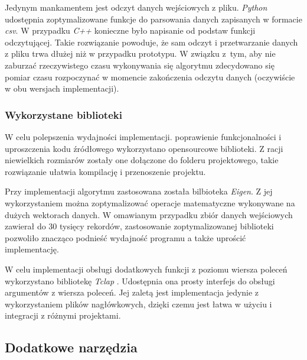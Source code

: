 Jedynym mankamentem jest odczyt danych wejściowych z pliku. \textit{Python} udostępnia zoptymalizowane funkcje do parsowania danych zapisanych w formacie \textit{csv}. W przypadku \textit{C++} konieczne było napisanie od podstaw funkcji odczytującej. Takie rozwiązanie powoduje, że sam odczyt i przetwarzanie danych z pliku trwa dłużej niż w przypadku prototypu. W związku z~tym, aby nie zaburzać rzeczywistego czasu wykonywania się algorytmu zdecydowano się pomiar czasu rozpoczynać w momencie zakończenia odczytu danych (oczywiście w obu wersjach implementacji).

\subsubsection{Wykorzystane biblioteki}
W celu polepszenia wydajności implementacji. poprawienie funkcjonalności i uproszczenia kodu źródłowego wykorzystano opensourcowe biblioteki. Z racji niewielkich rozmiarów zostały one dołączone do folderu projektowego, takie rozwiązanie ułatwia kompilację i przenoszenie projektu.

Przy implementacji algorytmu zastosowana została bilbioteka \textit{Eigen}\cite{eigen}. Z jej wykorzystaniem można zoptymalizować operacje matematyczne wykonywane na dużych wektorach danych. W omawianym przypadku zbiór danych wejściowych zawierał do 30 tysięcy rekordów, zastosowanie zoptymalizowanej biblioteki pozwoliło znacząco podnieść wydajność programu a także uprościć implementację.

W celu implementacji obsługi dodatkowych funkcji z poziomu wiersza poleceń wykorzystano bibliotekę \textit{Tclap} \cite{tclap}. Udostępnia ona prosty interfejs do obsługi argumentów z wiersza poleceń. Jej zaletą jest implementacja jedynie z wykorzystaniem plików nagłówkowych, dzięki czemu jest łatwa w użyciu i integracji z różnymi projektami.

\subsection{Dodatkowe narzędzia}
\label{subsec_narzedzia}

